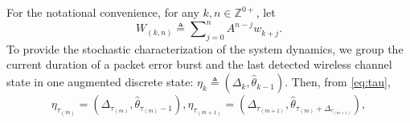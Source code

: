 \documentclass[journal,twoside,web]{ieeecolor}
\begin{document}
For the notational convenience, for any $k,n\in\mathbb{Z}^{0+}$, let
\begin{equation}\label{eq:calPsi}
W_{\!(k,n)} \!\triangleq\! \sum\nolimits_{j=0}^{n}A^{n-j} w_{k+j}^{}.
\end{equation}
To provide the stochastic characterization of the system dynamics, we group the current duration of a packet error burst and the last detected wireless channel state in one augmented discrete state:
$\eta_{k}^{} \!\triangleq\! (\mathit{\Delta}_{k},\hat{\theta}_{k-1})$. Then, from \eqref{eq:tau},
\begin{subequations}\label{eq:etatau}
\begin{equation}\label{eq:etataum}
    \eta_{\tau_{(m)}}^{} = (\mathit{\Delta}_{\tau_{(m)}},\hat{\theta}_{\tau_{(m)}-1}),
\end{equation}
\begin{equation}\label{eq:etataump}
    \eta_{\tau_{(m+1)}}^{} = (\mathit{\Delta}_{\tau_{(m+1)}},\hat{\theta}_{\tau_{(m)}+\mathit{\Delta}_{\tau_{(m+1)}}}),
\end{equation}
\end{subequations}
\newpage
\end{document}
